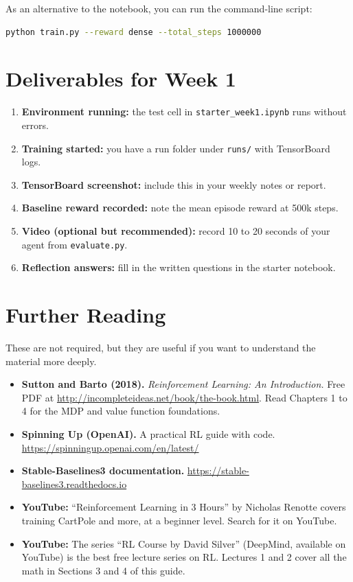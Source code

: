 \documentclass[12pt, a4paper]{article}
\begin{document}
As an alternative to the notebook, you can run the command-line script:
\begin{lstlisting}[language=bash]
python train.py --reward dense --total_steps 1000000
\end{lstlisting}

\section{Deliverables for Week 1}

\begin{enumerate}[label=\textbf{D\arabic*.}]
    \item \textbf{Environment running:} the test cell in \texttt{starter\_week1.ipynb} runs without errors.
    \item \textbf{Training started:} you have a run folder under \texttt{runs/} with TensorBoard logs.
    \item \textbf{TensorBoard screenshot:} include this in your weekly notes or report.
    \item \textbf{Baseline reward recorded:} note the mean episode reward at 500k steps.
    \item \textbf{Video (optional but recommended):} record 10 to 20 seconds of your agent from \texttt{evaluate.py}.
    \item \textbf{Reflection answers:} fill in the written questions in the starter notebook.
\end{enumerate}

\section{Further Reading}

These are not required, but they are useful if you want to understand the material more deeply.

\begin{itemize}
    \item \textbf{Sutton and Barto (2018).} \textit{Reinforcement Learning: An Introduction.} Free PDF at \url{http://incompleteideas.net/book/the-book.html}. Read Chapters 1 to 4 for the MDP and value function foundations.

    \item \textbf{Spinning Up (OpenAI).} A practical RL guide with code. \url{https://spinningup.openai.com/en/latest/}

    \item \textbf{Stable-Baselines3 documentation.} \url{https://stable-baselines3.readthedocs.io}

    \item \textbf{YouTube:} ``Reinforcement Learning in 3 Hours'' by Nicholas Renotte covers training CartPole and more, at a beginner level. Search for it on YouTube.

    \item \textbf{YouTube:} The series ``RL Course by David Silver'' (DeepMind, available on YouTube) is the best free lecture series on RL. Lectures 1 and 2 cover all the math in Sections 3 and 4 of this guide.
\end{itemize}
\end{document}
